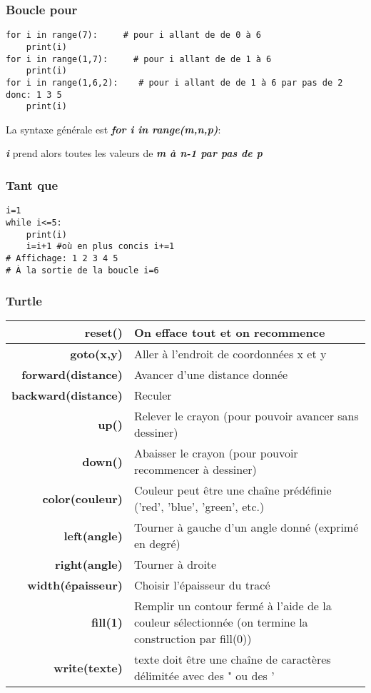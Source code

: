 \documentclass[10pt,dvipsnames,  dvips]{article}
\begin{document}
\subsubsection*{Boucle pour}

\begin{lstlisting}
for i in range(7):     # pour i allant de de 0 à 6
	print(i)
for i in range(1,7):     # pour i allant de de 1 à 6
	print(i)
for i in range(1,6,2):    # pour i allant de de 1 à 6 par pas de 2 donc: 1 3 5
	print(i)
\end{lstlisting}

La syntaxe générale est \textbf{\textit{for i in range(m,n,p)}}:

\textbf{\textit{i}} prend alors toutes les valeurs de \textbf{\textit{m à n-1 par pas de p}}

\subsubsection*{Tant que}

\begin{lstlisting}
i=1
while i<=5:
	print(i)
	i=i+1 #où en plus concis i+=1
# Affichage: 1 2 3 4 5
# À la sortie de la boucle i=6
\end{lstlisting}




\subsubsection*{Turtle}


\begin{tabular}[]{| r | >{\raggedright}m{12cm} |}
\hline \textbf{reset()} & On efface tout et on recommence  \tabularnewline
\hline \textbf{goto(x,y)} & Aller à l’endroit de coordonnées x et y  \tabularnewline
\hline \textbf{forward(distance)} & Avancer d’une distance donnée\tabularnewline
\hline \textbf{backward(distance)} & Reculer  \tabularnewline
\hline \textbf{up()}  &  Relever le crayon (pour pouvoir avancer sans dessiner)  \tabularnewline
\hline \textbf{down()}  & Abaisser le crayon (pour pouvoir recommencer à dessiner)  \tabularnewline
\hline \textbf{color(couleur)} &  Couleur peut être une chaîne prédéfinie (’red’, ’blue’, ’green’, etc.)  \tabularnewline
\hline \textbf{left(angle)}  & Tourner à gauche d’un angle donné (exprimé en degré)  \tabularnewline
\hline \textbf{right(angle)}  & Tourner à droite  \tabularnewline
\hline \textbf{width(épaisseur)}  & Choisir l’épaisseur du tracé  \tabularnewline
\hline \textbf{fill(1)}  & Remplir un contour fermé à l’aide de la couleur sélectionnée (on termine la construction par fill(0))  \tabularnewline
\hline \textbf{write(texte)}  &  texte doit être une chaîne de caractères délimitée avec des " ou des ’\tabularnewline
\hline
\end{tabular} 
\end{document}
